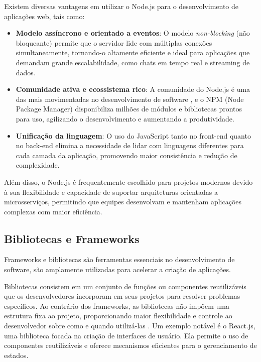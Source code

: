 Existem diversas vantagens em utilizar o Node.js para o desenvolvimento de aplicações web, tais como:

\begin{itemize}
    \item \textbf{Modelo assíncrono e orientado a eventos}: O modelo \emph{non-blocking} (não bloqueante) permite que o servidor lide com múltiplas conexões simultaneamente, tornando-o altamente eficiente e ideal para aplicações que demandam grande escalabilidade, como chats em tempo real e streaming de dados.
    \item \textbf{Comunidade ativa e ecossistema rico}: A comunidade do Node.js é uma das mais movimentadas no desenvolvimento de software \cite{size-programming-languages}, e o NPM (Node Package Manager) disponibiliza milhões de módulos e bibliotecas prontos para uso, agilizando o desenvolvimento e aumentando a produtividade.
    \item \textbf{Unificação da linguagem}: O uso do JavaScript tanto no front-end quanto no back-end elimina a necessidade de lidar com linguagens diferentes para cada camada da aplicação, promovendo maior consistência e redução de complexidade.
\end{itemize}

Além disso, o Node.js é frequentemente escolhido para projetos modernos devido à sua flexibilidade e capacidade de suportar arquiteturas orientadas a microsserviços, permitindo que equipes desenvolvam e mantenham aplicações complexas com maior eficiência.

\subsection{Bibliotecas e Frameworks}


Frameworks e bibliotecas são ferramentas essenciais no desenvolvimento de software, são amplamente utilizadas para acelerar a criação de aplicações.

Bibliotecas consistem em um conjunto de funções ou componentes reutilizáveis que os desenvolvedores incorporam em seus projetos para resolver problemas específicos. Ao contrário dos frameworks, as bibliotecas não impõem uma estrutura fixa ao projeto, proporcionando maior flexibilidade e controle ao desenvolvedor sobre como e quando utilizá-las \cite{libs-vs-frameworks}. Um exemplo notável é o React.js, uma biblioteca focada na criação de interfaces de usuário. Ela permite o uso de componentes reutilizáveis e oferece mecanismos eficientes para o gerenciamento de estados.

